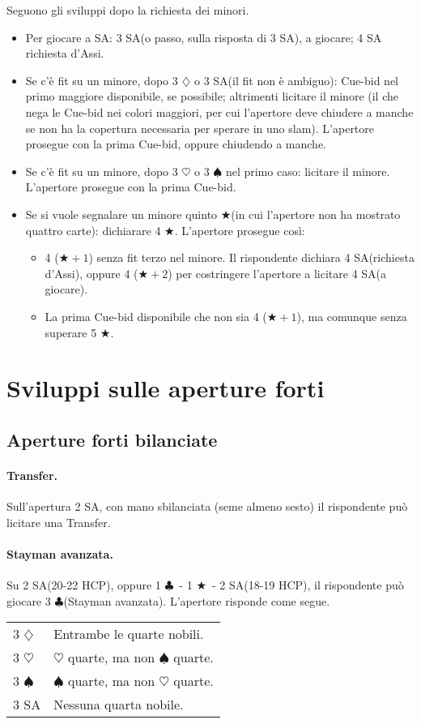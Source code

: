 \documentclass[a4paper,10pt]{article}
\renewcommand{\c}{$\clubsuit$\xspace}
\renewcommand{\d}{$\diamondsuit$\xspace}
\newcommand{\h}{$\heartsuit$\xspace}
\newcommand{\s}{$\spadesuit$\xspace}
\renewcommand{\j}{$\bigstar$\xspace}
\newcommand{\sa}{SA\xspace}
\newcommand{\smallspace}{\vskip0.3cm}
\newenvironment{twocol}
  {\smallspace\noindent\begin{tabular}{l p{0.78\textwidth}}}
  {\end{tabular}\smallspace}
\begin{document}
\noindent Seguono gli sviluppi dopo la richiesta dei minori.
\begin{itemize}
 \item Per giocare a \sa: 3 \sa (o passo, sulla risposta di 3 \sa), a giocare; 4 \sa richiesta d'Assi.
 \item Se c'è fit su un minore, dopo 3 \d o 3 \sa (il fit non è ambiguo): Cue-bid nel primo maggiore disponibile, se possibile; altrimenti licitare il minore (il che nega le Cue-bid nei colori maggiori, per cui l'apertore deve chiudere a manche se non ha la copertura necessaria per sperare in uno slam).
 L'apertore prosegue con la prima Cue-bid, oppure chiudendo a manche.
 \item Se c'è fit su un minore, dopo 3 \h o 3 \s nel primo caso: licitare il minore.
 L'apertore prosegue con la prima Cue-bid.
 \item Se si vuole segnalare un minore quinto \j (in cui l'apertore non ha mostrato quattro carte): dichiarare 4 \j.
 L'apertore prosegue così:
 \begin{itemize}
  \item 4 ($\bigstar+1$) senza fit terzo nel minore. Il rispondente dichiara 4 \sa (richiesta d'Assi), oppure 4 ($\bigstar+2$) per costringere l'apertore a licitare 4 \sa (a giocare).
  \item La prima Cue-bid disponibile che non sia 4 ($\bigstar+1$), ma comunque senza superare 5 \j.
  
 \end{itemize}
\end{itemize}

\pagebreak

\section{Sviluppi sulle aperture forti}

\subsection{Aperture forti bilanciate}

\paragraph{Transfer.} Sull'apertura 2 \sa, con mano sbilanciata (seme almeno sesto) il rispondente può licitare una Transfer.

\paragraph{Stayman avanzata.} Su 2 \sa (20-22 HCP), oppure 1 \c\ - 1 \j\ - 2 \sa (18-19 HCP), il rispondente può giocare 3 \c (Stayman avanzata). L'apertore risponde come segue.
\begin{twocol}
 3 \d & Entrambe le quarte nobili.\\
 3 \h & \h quarte, ma non \s quarte.\\
 3 \s & \s quarte, ma non \h quarte.\\
 3 \sa & Nessuna quarta nobile.\\
\end{twocol}
\end{document}
